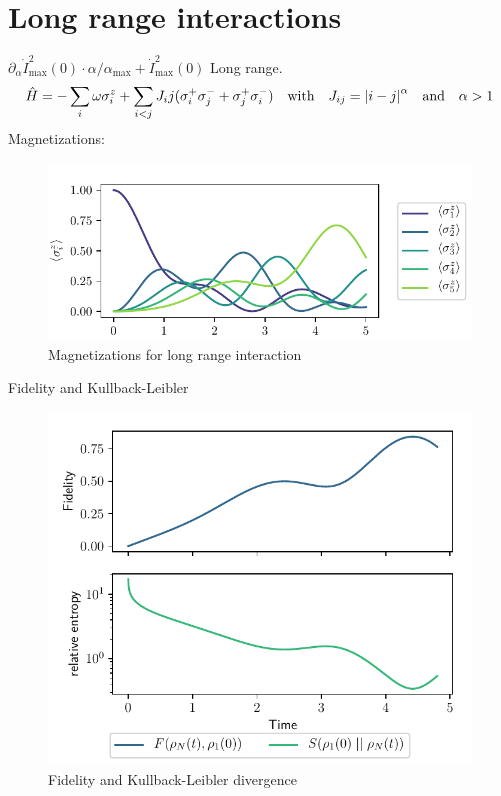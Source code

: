\documentclass{book}
\numberwithin{equation}{section} %
\begin{document}
\section{Long range interactions}
$\partial_\alpha \dot{I}^2_\text{max}(0) \cdot \alpha/\alpha_\text{max} + \dot{I}^2_\text{max}(0)$
Long range.\cite{BA_Maier_longrange}
\begin{align}\label{eq:hamiltonian-long-range-int}
    \hat{H} = -\sum\limits_i \omega\sigma^z_i + \sum\limits_{i<j} J_ij (\sigma^+_i\sigma^-_j+\sigma^+_j\sigma^-_{i})\qq{with}
    J_{ij} = \abs{i-j}^{\alpha}\qq{and} \alpha>1
\end{align}
Magnetizations:
\begin{figure}[h!]
    \centering
    \includegraphics{alltheplots/longrange/expval_z.pdf}
    \caption{Magnetizations for long range interaction}
    \label{fig:long-expval-z}
\end{figure}
Fidelity and Kullback-Leibler
\begin{figure}[h!]
    \centering
    \includegraphics{alltheplots/longrange/3_fidelity_kld.pdf}
    \caption{Fidelity and Kullback-Leibler divergence}
    \label{fig:long-fid-kld}
\end{figure}
\end{document}

